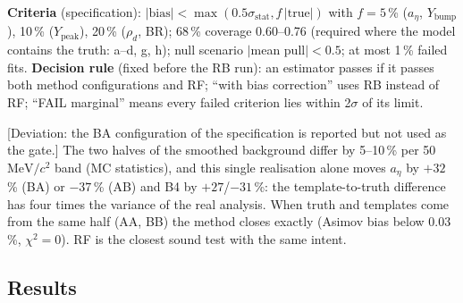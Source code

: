 \documentclass[11pt,a4paper]{article}
\newcommand{\nbinv}{\ensuremath{\mathrm{nb}^{-1}}\xspace}
\newcommand{\MeVcc}{\ensuremath{\mathrm{MeV}/c^{2}}\xspace}
\newcommand{\code}[1]{\texttt{\detokenize{#1}}}
\newcommand{\aEta}{\ensuremath{a_\eta}\xspace}
\newcommand{\Ybump}{\ensuremath{Y_{\mathrm{bump}}}\xspace}
\newcommand{\Ypeak}{\ensuremath{Y_{\mathrm{peak}}}\xspace}
\newcommand{\rhod}{\ensuremath{\rho_d}\xspace}
\newcommand{\flag}[1]{\textcolor{red!60!black}{[#1]}}
\newcommand{\tabin}[1]{}
\begin{document}
\textbf{Criteria} (specification): $|\mathrm{bias}|<\max(0.5\sigma_{\mathrm{stat}},f\,|\mathrm{true}|)$ with $f=5$\,\% (\aEta, \Ybump),
10\,\% (\Ypeak), 20\,\% (\rhod, BR); 68\,\% coverage 0.60--0.76 (required where the model contains the truth: a--d, g, h); null scenario
$|$mean pull$|<0.5$; at most 1\,\% failed fits. \textbf{Decision rule} (fixed before the RB run): an estimator passes if it passes both
method configurations and RF; ``with bias correction'' uses RB instead of RF; ``FAIL marginal'' means every failed criterion lies within
2$\sigma$ of its limit.

\flag{Deviation: the BA configuration of the specification is reported but not used as the gate.} The two halves of the smoothed
background differ by 5--10\,\% per 50\,\MeVcc band (MC statistics), and this single realisation alone moves \aEta by $+32$\,\% (BA) or
$-37$\,\% (AB) and B4 by $+27$/$-31$\,\%: the template-to-truth difference has four times the variance of the real analysis. When truth and
templates come from the same half (AA, BB) the method closes exactly (Asimov bias below 0.03\,\%, $\chi^2=0$). RF is the closest sound test
with the same intent.

\subsection{Results}
\begin{table}[H]
\centering
\caption{Spec.\ Table~V1: stress closure. Columns 3--5: statistical error, template-statistics error and mean replica shift in the realistic
configuration RF, scenario (a); columns 6--10: bias in scenario (a) per configuration (RF+BC $=$ RB); 11--13: largest bias over (a)--(h)
(scenario in brackets); 14--17: verdicts (``fail (m)'': within 2$\sigma$ of the limit). All in per cent of the true value (RF (a): \aEta
0.4, \Ybump 21\,904, \Ypeak 4\,866 counts). Precision of the biases: 0.1\,\% (BA, AB, AA, BB), 0.4--1\,\% (RF, RB). S0, isBest $\ge0$,
$L=6079.2\,\nbinv$, 500 toys per point. Source: WP4 (\code{wp4_V1.txt}). Fall-back consequence: estimators that fail are cross-checks only.}
\label{tab:V1}
\scriptsize
\setlength{\tabcolsep}{2pt}
\resizebox{\textwidth}{!}{\tabin{wp4_V1.tex}}
\end{table}
\end{document}
